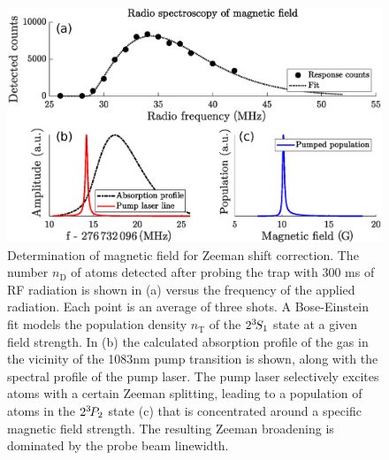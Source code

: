 	\begin{figure}
	\centering
  \includegraphics[width=\textwidth]{fig/spectroscopy/rf_spec_subfig}
  \caption{Determination of magnetic field for Zeeman shift correction.
	The number $n_\text{D}$ of atoms detected after probing the trap with 300 ms of RF radiation is shown in (a) versus the frequency of the applied radiation.
	Each point is an average of three shots.
	A Bose-Einstein fit models the population density $n_\text{T}$ of the $2^{3\!} S_1$ state at a given field strength.
	In (b) the calculated absorption profile of the gas in the vicinity of the 1083nm pump transition is shown, along with the spectral profile of the pump laser.
	The pump laser selectively excites atoms with a certain Zeeman splitting, leading to a population of atoms in the $2^{3\!} P_2$ state (c) that is concentrated around a specific magnetic field strength.
	The resulting Zeeman broadening is dominated by the probe beam linewidth.}
  \label{fig:RF_spec}
\end{figure}



